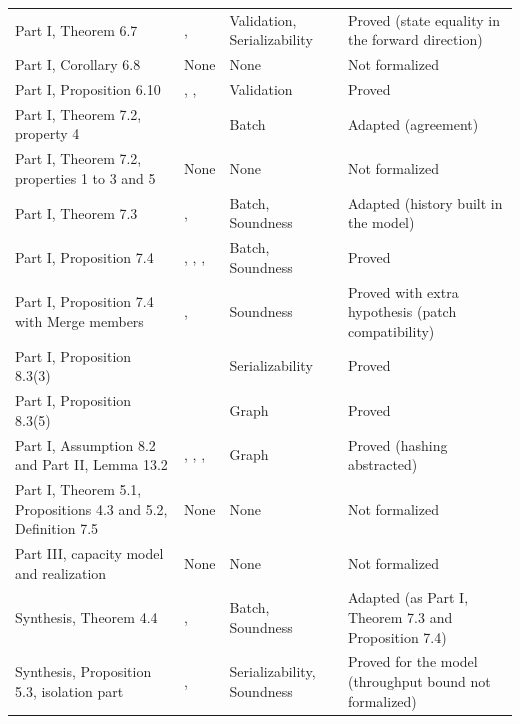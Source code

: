 \documentclass[11pt,letterpaper]{article}
\theoremstyle{definition}
\theoremstyle{remark}
\begin{document}
\begin{small}
\begin{longtable}{@{}L{3.6cm}L{5.4cm}L{2.4cm}L{3.2cm}@{}}
Part I, Theorem 6.7 & ,  & Validation, Serializability & Proved (state equality in the forward direction) \\
Part I, Corollary 6.8 & None & None & Not formalized \\
Part I, Proposition 6.10 & , ,  & Validation & Proved \\
Part I, Theorem 7.2, property 4 &  & Batch & Adapted (agreement) \\
Part I, Theorem 7.2, properties 1 to 3 and 5 & None & None & Not formalized \\
Part I, Theorem 7.3 & ,  & Batch, Soundness & Adapted (history built in the model) \\
Part I, Proposition 7.4 & , , ,  & Batch, Soundness & Proved \\
Part I, Proposition 7.4 with Merge members & ,  & Soundness & Proved with extra hypothesis (patch compatibility) \\
Part I, Proposition 8.3(3) &  & Serializability & Proved \\
Part I, Proposition 8.3(5) &  & Graph & Proved \\
Part I, Assumption 8.2 and Part II, Lemma 13.2 & , , ,  & Graph & Proved (hashing abstracted) \\
Part I, Theorem 5.1, Propositions 4.3 and 5.2, Definition 7.5 & None & None & Not formalized \\
Part III, capacity model and realization & None & None & Not formalized \\
Synthesis, Theorem 4.4 & ,  & Batch, Soundness & Adapted (as Part I, Theorem 7.3 and Proposition 7.4) \\
Synthesis, Proposition 5.3, isolation part & ,  & Serializability, Soundness & Proved for the model (throughput bound not formalized) \\
\end{longtable}
\end{small}
\end{document}
